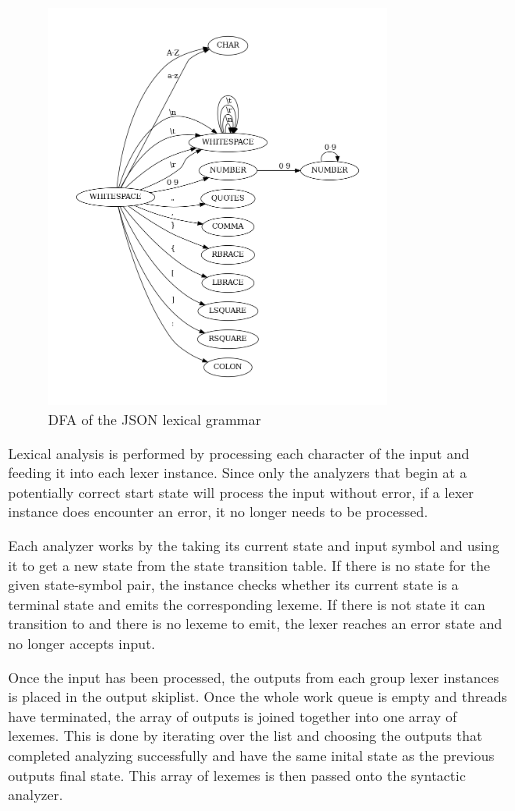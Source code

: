 \begin{figure}[t]
\includegraphics[width=0.8\textwidth]{images/dfa.png}
\caption{DFA of the JSON lexical grammar}
\label{fig:dfa}
\end{figure}

Lexical analysis is performed by processing each character of the input and feeding it into each
lexer instance. Since only the analyzers that begin at a potentially correct start state will
process the input without error, if a lexer instance does encounter an error, it no longer needs
to be processed. 

Each analyzer works by the taking its current state and input symbol and using it to get a new state
from the state transition table. If there is no state for the given state-symbol pair, the instance
checks whether its current state is a terminal state and emits the corresponding lexeme. If there is
not state it can transition to and there is no lexeme to emit, the lexer reaches an error state and
no longer accepts input. 

Once the input has been processed, the outputs from each group lexer instances is placed in the
output skiplist. Once the whole work queue is empty and threads have terminated, the array of
outputs is joined together into one array of lexemes. This is done by iterating over the list and
choosing the outputs that completed analyzing successfully and have the same inital state as the
previous outputs final state. This array of lexemes is then passed onto the syntactic analyzer.

